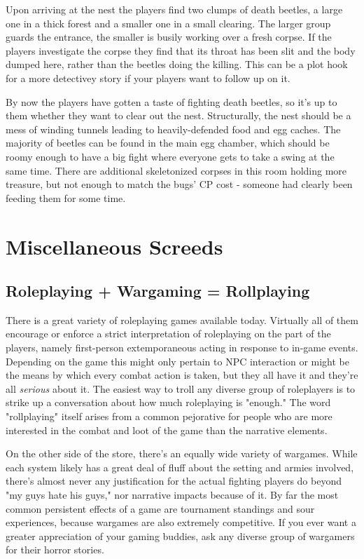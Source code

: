 \documentclass[12pt,a4paper,twocolumn]{article}
\begin{document}
Upon arriving at the nest the players find two clumps of death beetles, a large one in a thick forest and a smaller one in a small clearing.  The larger group guards the entrance, the smaller is busily working over a fresh corpse.  If the players investigate the corpse they find that its throat has been slit and the body dumped here, rather than the beetles doing the killing.  This can be a plot hook for a more detectivey story if your players want to follow up on it.

By now the players have gotten a taste of fighting death beetles, so it's up to them whether they want to clear out the nest.  Structurally, the nest should be a mess of winding tunnels leading to heavily-defended food and egg caches.  The majority of beetles can be found in the main egg chamber, which should be roomy enough to have a big fight where everyone gets to take a swing at the same time.  There are additional skeletonized corpses in this room holding more treasure, but not enough to match the bugs' CP cost - someone had clearly been feeding them for some time.

\section{Miscellaneous Screeds}
\subsection{Roleplaying + Wargaming = Rollplaying}
There is a great variety of roleplaying games available today.  Virtually all of them encourage or enforce a strict interpretation of roleplaying on the part of the players, namely first-person extemporaneous acting in response to in-game events.  Depending on the game this might only pertain to NPC interaction or might be the means by which every combat action is taken, but they all have it and they're all {\em serious} about it.  The easiest way to troll any diverse group of roleplayers is to strike up a conversation about how much roleplaying is "enough."  The word "rollplaying" itself arises from a common pejorative for people who are more interested in the combat and loot of the game than the narrative elements.

On the other side of the store, there's an equally wide variety of wargames.  While each system likely has a great deal of fluff about the setting and armies involved, there's almost never any justification for the actual fighting players do beyond "my guys hate his guys," nor narrative impacts because of it.  By far the most common persistent effects of a game are tournament standings and sour experiences, because wargames are also extremely competitive.  If you ever want a greater appreciation of your gaming buddies, ask any diverse group of wargamers for their horror stories.
\end{document}
